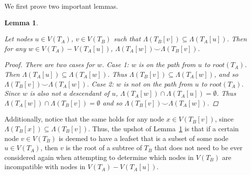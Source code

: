 \documentclass{article}
\newcommand{\compatible}{\smile}
\newcommand{\leafset}{\Lambda}
\newtheorem{filterclusterssubsetcompatible}[incompatibility]{Lemma}
\begin{document}
    We first prove two important lemmas.

    \begin{filterclusterssubsetcompatible}
        \label{lem:filterclusterssubsetcompatible}

        Let nodes $u \in V(T_A)$, $v \in V(T_B)$ such that $\leafset(T_B[v]) \subseteq \leafset(T_A[u])$. Then for any $w \in V(T_A) - V(T_A[u])$, $\leafset(T_A[w]) \compatible \leafset(T_B[v])$.

        \begin{proof}
            There are two cases for $w$. Case 1: $w$ is on the path from $u$ to $root(T_A)$. Then $\leafset(T_A[u]) \subseteq \leafset(T_A[w])$. Thus $\leafset(T_B[v]) \subseteq \leafset(T_A[w])$, and so $\leafset(T_B[v]) \compatible \leafset(T_A[w])$. Case 2: $w$ is not on the path from $u$ to $root(T_A)$. Since $w$ is also not a descendant of $u$, $\leafset(T_A[w]) \cap \leafset(T_A[u]) = \emptyset$. Thus $\leafset(T_A[w]) \cap \leafset(T_B[v]) = \emptyset$ and so $\leafset(T_B[v]) \compatible \leafset(T_A[w])$.
        \end{proof}
    \end{filterclusterssubsetcompatible}

    Additionally, notice that the same holds for any node $x \in V(T_B[v])$, since $\leafset(T_B[x]) \subseteq \leafset(T_B[v])$. Thus, the upshot of Lemma~\ref{lem:filterclusterssubsetcompatible} is that if a certain node $v \in V(T_B)$ is deemed to have a leafset that is a subset of some node $u \in V(T_A)$, then $v$ is the root of a subtree of $T_B$ that does not need to be ever considered again when attempting to determine which nodes in $V(T_B)$ are incompatible with nodes in $V(T_A) - V(T_A[u])$.
\end{document}
